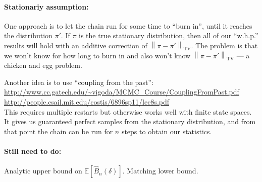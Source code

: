 \documentclass[11pt]{article}
\newcommand{\EE}[1]{\mathbb{E}\left[#1\right]}
\theoremstyle{plain}
\theoremstyle{definition}
\theoremstyle{remark}
\newcommand\tvnorm[1]{\left\| #1 \right\|_{\mathrm{TV}}}
\begin{document}
\paragraph{Stationariy assumption:}
One approach is to let the chain run for some time to ``burn in'',
until it reaches the distribution $\pi'$. If $\pi$ is the true stationary distribution,
then all of our ``w.h.p.'' results will hold with an additive correction of 
$\tvnorm{\pi-\pi'}$. The problem is that we won't know for how long to burn in
and also won't know $\tvnorm{\pi-\pi'}$ --- a chicken and egg problem.

Another idea is to use ``coupling from the past'':\\
\url{http://www.cc.gatech.edu/~vigoda/MCMC_Course/CouplingFromPast.pdf}
\\
\url{http://people.csail.mit.edu/costis/6896sp11/lec8s.pdf}
\\
This requires multiple restarts but otherwise works well with finite state spaces.
It gives us guaranteed perfect samples from the stationary distribution,
and from that point the chain can be run for $n$ steps to obtain our statistics.


\paragraph{Still need to do:}
Analytic upper bound on $\EE{ \hat{B}_n(\delta)}$.
Matching lower bound.



\end{document}
